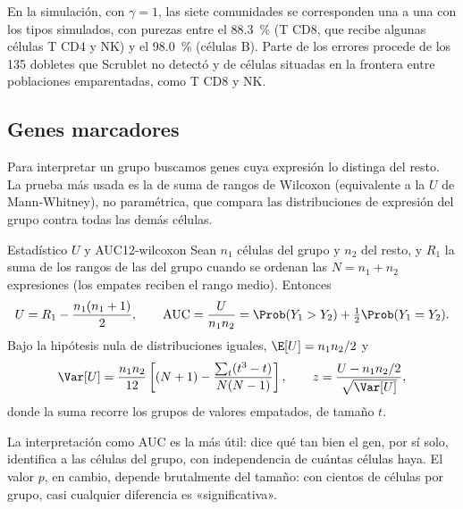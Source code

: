 En la simulación, con $\gamma=1$, las siete comunidades se corresponden una a una con los tipos simulados, con purezas entre el \SI{88.3}{\percent} (T CD8, que recibe algunas células T CD4 y NK) y el \SI{98.0}{\percent} (células B). Parte de los errores procede de los 135 dobletes que Scrublet no detectó y de células situadas en la frontera entre poblaciones emparentadas, como T CD8 y NK.

\subsection{Genes marcadores}

Para interpretar un grupo buscamos genes cuya expresión lo distinga del resto. La prueba más usada es la de suma de rangos de Wilcoxon (equivalente a la $U$ de Mann-Whitney), no paramétrica, que compara las distribuciones de expresión del grupo contra todas las demás células.

\begin{definicion}{Estadístico $U$ y AUC}{12-wilcoxon}
Sean $n_1$ células del grupo y $n_2$ del resto, y $R_1$ la suma de los rangos de las del grupo cuando se ordenan las $N=n_1+n_2$ expresiones (los empates reciben el rango medio). Entonces
\begin{equation}\label{eq:12-u}
U = R_1-\frac{n_1(n_1+1)}{2},\qquad \mathrm{AUC}=\frac{U}{n_1 n_2}=\Prob(Y_1>Y_2)+\tfrac12\Prob(Y_1=Y_2).
\end{equation}
Bajo la hipótesis nula de distribuciones iguales, $\E[U]=n_1n_2/2$ y
\begin{equation}\label{eq:12-uvar}
\Var[U]=\frac{n_1n_2}{12}\left[(N+1)-\frac{\sum_t (t^3-t)}{N(N-1)}\right],\qquad z=\frac{U-n_1n_2/2}{\sqrt{\Var[U]}},
\end{equation}
donde la suma recorre los grupos de valores empatados, de tamaño $t$.
\end{definicion}
\begin{simbolos}
\end{simbolos}

La interpretación como AUC es la más útil: dice qué tan bien el gen, por sí solo, identifica a las células del grupo, con independencia de cuántas células haya. El valor $p$, en cambio, depende brutalmente del tamaño: con cientos de células por grupo, casi cualquier diferencia es «significativa».

